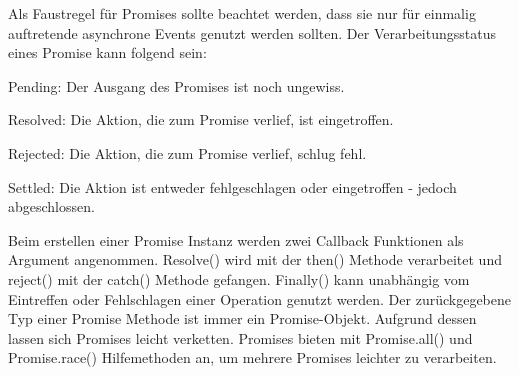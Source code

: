 \noindent
Als Faustregel für Promises sollte beachtet werden, dass sie nur für einmalig auftretende asynchrone Events genutzt werden sollten. Der Verarbeitungsstatus eines Promise kann folgend sein:

\begin{description} 
\item Pending: Der Ausgang des Promises ist noch ungewiss.
\item Resolved: Die Aktion, die zum Promise verlief, ist eingetroffen.
\item Rejected: Die Aktion, die zum Promise verlief, schlug fehl.
\item Settled: Die Aktion ist entweder fehlgeschlagen oder eingetroffen - jedoch abgeschlossen.
\end{description}

\noindent
Beim erstellen einer Promise Instanz werden zwei Callback Funktionen als Argument angenommen. Resolve() wird mit der then() Methode verarbeitet und reject() mit der catch() Methode gefangen. Finally() kann unabhängig vom Eintreffen oder Fehlschlagen einer Operation genutzt werden. Der zurückgegebene Typ einer Promise Methode ist immer ein Promise-Objekt. Aufgrund dessen lassen sich Promises leicht verketten. Promises bieten mit Promise.all() und Promise.race() Hilfemethoden an, um mehrere Promises leichter zu verarbeiten.




